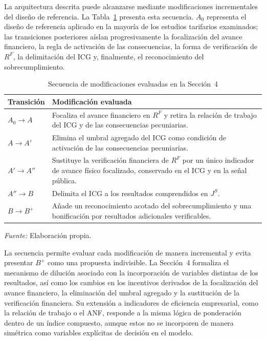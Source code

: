 La arquitectura descrita puede alcanzarse mediante modificaciones incrementales del diseño de referencia. La Tabla~\ref{tab:secuencia_esquemas} presenta esta secuencia. \(A_0\) representa el diseño de referencia aplicado en la mayoría de los estudios tarifarios examinados; las transiciones posteriores aíslan progresivamente la focalización del avance financiero, la regla de activación de las consecuencias, la forma de verificación de \(R^{F}\), la delimitación del ICG y, finalmente, el reconocimiento del sobrecumplimiento.

\begin{table}[!t]
\centering
\caption{Secuencia de modificaciones evaluadas en la Sección~4}
\label{tab:secuencia_esquemas}
\small
\renewcommand{\arraystretch}{1.15}
\setlength{\tabcolsep}{4pt}
\begin{tabularx}{\columnwidth}{@{}p{}X@{}}
\hline
\textbf{Transición} & \textbf{Modificación evaluada} \\
\hline
\(A_0\to A\) & Focaliza el avance financiero en \(R^{F}\) y retira la relación de trabajo del ICG y de las consecuencias pecuniarias. \\
\(A\to A'\) & Elimina el umbral agregado del ICG como condición de activación de las consecuencias pecuniarias. \\
\(A'\to A''\) & Sustituye la verificación financiera de \(R^{F}\) por un único indicador de avance físico focalizado, conservado en el ICG y en la señal pública. \\
\(A''\to B\) & Delimita el ICG a los resultados comprendidos en \(J^{S}\). \\
\(B\to B^{+}\) & Añade un reconocimiento acotado del sobrecumplimiento y una bonificación por resultados adicionales verificables. \\
\hline
\end{tabularx}
\begin{flushleft}
\footnotesize
\textit{Fuente:} Elaboración propia.
\end{flushleft}
\end{table}

La secuencia permite evaluar cada modificación de manera incremental y evita presentar \(B^{+}\) como una propuesta indivisible. La Sección~4 formaliza el mecanismo de dilución asociado con la incorporación de variables distintas de los resultados, así como los cambios en los incentivos derivados de la focalización del avance financiero, la eliminación del umbral agregado y la sustitución de la verificación financiera. Su extensión a indicadores de eficiencia empresarial, como la relación de trabajo o el ANF, responde a la misma lógica de ponderación dentro de un índice compuesto, aunque estos no se incorporen de manera simétrica como variables explícitas de decisión en el modelo.
